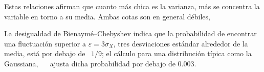 Estas  relaciones  afirman que  cuanto  m\'as chica  es  la  varianza, m\'as  se
concentra la variable en torno a su media. Ambas cotas son en general d\'ebiles,
%
\begin{ejemplo}
  La  desigualdad  de  Bienaym\'e--Chebyshev   indica  que  la  probabilidad  de
  encontrar  una  fluctuaci\'on superior  a  $\varepsilon  =  3 \sigma_X$,  tres
  desviaciones est\'andar alrededor  de la media, est\'a por  debajo de \ $1/9$;
  el  c\'alculo   para  una  distribuci\'on   t\'ipica  como  la   Gaussiana,  \
  \modif{$p_X(x)    =    \frac{1}{\sqrt{2    \pi}   \sigma_X}    \exp\left(    -
      \frac{x-\mu_X)^2}{2} \right)$}  \ ajusta dicha probabilidad  por debajo de
  $0.003$.
\end{ejemplo}


